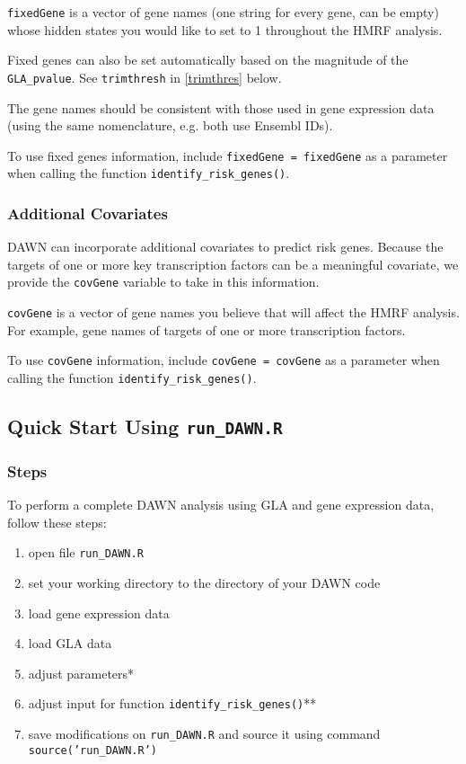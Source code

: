 \documentclass{article}
\begin{document}
		\texttt{fixedGene} is a vector of gene names (one string for every gene, can be empty) whose hidden states you would like to set to 1 throughout the HMRF analysis.
		
		Fixed genes can also be set automatically based on the magnitude of the \texttt{GLA\_pvalue}.   See \texttt{trimthresh} in \ref{trimthres} below.
		
		The gene names should be consistent with those used in gene expression data (using the same nomenclature, e.g. both use Ensembl IDs).
		
		To use fixed genes information, include \texttt{fixedGene = fixedGene} as a parameter when calling the function \texttt{identify\_risk\_genes()}.
		
		\subsubsection{Additional Covariates}
		\label{inputAdditionalCovariates}
			
		DAWN can incorporate additional covariates to predict risk genes. Because the targets of one or more key transcription factors can be a meaningful covariate, we provide the \texttt{covGene} variable to take in this information. 
		 
		\texttt{covGene} is a vector of gene names you believe that will affect the HMRF analysis. For example,  gene names of targets of one or more transcription factors.
		
		To use \texttt{covGene} information, include \texttt{covGene = covGene} as a parameter when calling the function \texttt{identify\_risk\_genes()}.

	\subsection{Quick Start Using \texttt{run\_DAWN.R}}
	\subsubsection{Steps}
	To perform a complete DAWN analysis using GLA and gene expression data, follow these steps:
	\begin{enumerate}
		\item open file \texttt{run\_DAWN.R}
		\item set your working directory to the directory of your DAWN code
		\item load gene expression data
		\item load GLA data
		\item adjust parameters*
		\item adjust input for function \texttt{identify\_risk\_genes()}**
		\item save modifications on \texttt{run\_DAWN.R} and source it using command \texttt{source('run\_DAWN.R')}
	\end{enumerate}
\end{document}
